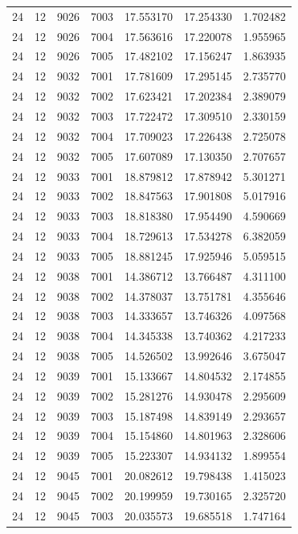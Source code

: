 \begin{table}
\begin{tabular}{rrrrrrr}
24 & 12 & 9026 & 7003 & 17.553170 & 17.254330 & 1.702482 \\
24 & 12 & 9026 & 7004 & 17.563616 & 17.220078 & 1.955965 \\
24 & 12 & 9026 & 7005 & 17.482102 & 17.156247 & 1.863935 \\
24 & 12 & 9032 & 7001 & 17.781609 & 17.295145 & 2.735770 \\
24 & 12 & 9032 & 7002 & 17.623421 & 17.202384 & 2.389079 \\
24 & 12 & 9032 & 7003 & 17.722472 & 17.309510 & 2.330159 \\
24 & 12 & 9032 & 7004 & 17.709023 & 17.226438 & 2.725078 \\
24 & 12 & 9032 & 7005 & 17.607089 & 17.130350 & 2.707657 \\
24 & 12 & 9033 & 7001 & 18.879812 & 17.878942 & 5.301271 \\
24 & 12 & 9033 & 7002 & 18.847563 & 17.901808 & 5.017916 \\
24 & 12 & 9033 & 7003 & 18.818380 & 17.954490 & 4.590669 \\
24 & 12 & 9033 & 7004 & 18.729613 & 17.534278 & 6.382059 \\
24 & 12 & 9033 & 7005 & 18.881245 & 17.925946 & 5.059515 \\
24 & 12 & 9038 & 7001 & 14.386712 & 13.766487 & 4.311100 \\
24 & 12 & 9038 & 7002 & 14.378037 & 13.751781 & 4.355646 \\
24 & 12 & 9038 & 7003 & 14.333657 & 13.746326 & 4.097568 \\
24 & 12 & 9038 & 7004 & 14.345338 & 13.740362 & 4.217233 \\
24 & 12 & 9038 & 7005 & 14.526502 & 13.992646 & 3.675047 \\
24 & 12 & 9039 & 7001 & 15.133667 & 14.804532 & 2.174855 \\
24 & 12 & 9039 & 7002 & 15.281276 & 14.930478 & 2.295609 \\
24 & 12 & 9039 & 7003 & 15.187498 & 14.839149 & 2.293657 \\
24 & 12 & 9039 & 7004 & 15.154860 & 14.801963 & 2.328606 \\
24 & 12 & 9039 & 7005 & 15.223307 & 14.934132 & 1.899554 \\
24 & 12 & 9045 & 7001 & 20.082612 & 19.798438 & 1.415023 \\
24 & 12 & 9045 & 7002 & 20.199959 & 19.730165 & 2.325720 \\
24 & 12 & 9045 & 7003 & 20.035573 & 19.685518 & 1.747164 \\

\end{tabular}
\end{table}
